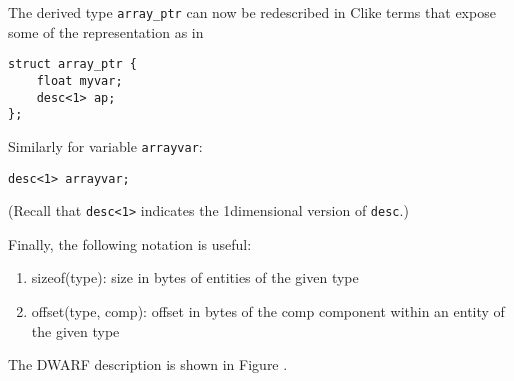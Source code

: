 The  derived type \texttt{array\_ptr} can now be redescribed
in C\dash like terms that expose some of the representation as in

\begin{lstlisting}[numbers=none]
struct array_ptr {
    float myvar;
    desc<1> ap;
};
\end{lstlisting}

Similarly for variable \texttt{arrayvar}:
\begin{lstlisting}[numbers=none]
desc<1> arrayvar;
\end{lstlisting}

(Recall that \texttt{desc\textless 1\textgreater} 
indicates the 1\dash dimensional version of \texttt{desc}.)

\newpage
Finally, the following notation is useful:
\begin{enumerate}[1. ]
\item  sizeof(type): size in bytes of entities of the given type
\item offset(type, comp): offset in bytes of the comp component
within an entity of the given type
\end{enumerate}

The DWARF description is shown 
in Figure .

